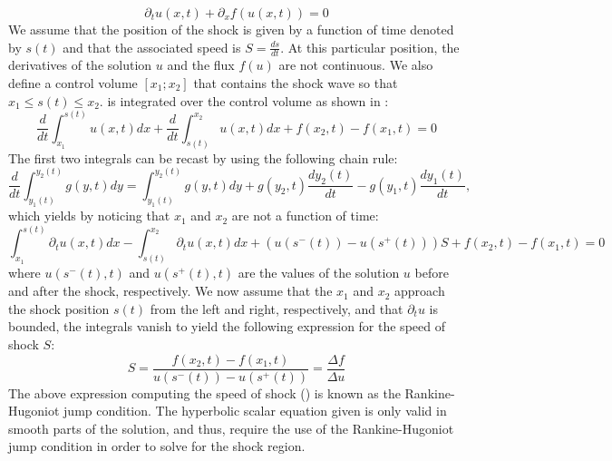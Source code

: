 %
\begin{equation}\label{eq:rh_sct1b}
\partial_t u(x,t) + \partial_x f(u(x,t)) = 0
\end{equation}
%
We assume that the position of the shock is given by a function of time denoted by $s(t)$ and that the associated speed is $S = \frac{ds}{dt}$. At this particular position, the derivatives of the solution $u$ and the flux $f(u)$ are not continuous. We also define a control volume $\left[ x_1; x_2 \right]$ that contains the shock wave so that $x_1 \leq s(t) \leq x_2$.  is integrated over the control volume as shown in :
%
\begin{equation}\label{eq:rh2_sct1b}
\frac{d}{dt} \int_{x_1}^{s(t)} u(x,t) dx + \frac{d}{dt} \int_{s(t)}^{x_2} u(x,t) dx + f(x_2,t) - f(x_1,t) = 0
\end{equation}
% 
The first two integrals can be recast by using the following chain rule:
%
\begin{equation}\label{eq:rh3_sct1b}
\frac{d}{dt} \int_{y_1(t)}^{y_2(t)} g(y,t) dy =  \int_{y_1(t)}^{y_2(t)} g(y,t) dy + g(y_2,t) \frac{d y_2(t)}{dt} - g(y_1,t) \frac{d y_1(t)}{dt},
\end{equation}
% 
which yields by noticing that $x_1$ and $x_2$ are not a function of time:
%
\begin{equation}\label{eq:rh4_sct1b}
\int_{x_1}^{s(t)} \partial_t u(x,t) dx - \int_{s(t)}^{x_2} \partial_t u(x,t) dx + \left( u(s^-(t)) - u(s^+(t)) \right) S + f(x_2,t) - f(x_1,t) = 0
\end{equation}
%
where $u(s^-(t),t)$ and $u(s^+(t),t)$ are the values of the solution $u$ before and after the shock, respectively. We now assume that the $x_1$ and $x_2$ approach the shock position $s(t)$ from the left and right, respectively, and that $\partial_t u$ is bounded, the integrals vanish to yield the following expression for the speed of shock $S$:
%
\begin{equation}\label{eq:rh5_sct1b}
S = \frac{f(x_2,t) - f(x_1,t)}{u(s^-(t)) - u(s^+(t))} = \frac{\Delta f}{\Delta u}
\end{equation}
%
The above expression computing the speed of shock () is known as the Rankine-Hugoniot jump condition. The hyperbolic scalar equation given  is only valid in smooth parts of the solution, and thus, require the use of the Rankine-Hugoniot jump condition in order to solve for the shock region.   
